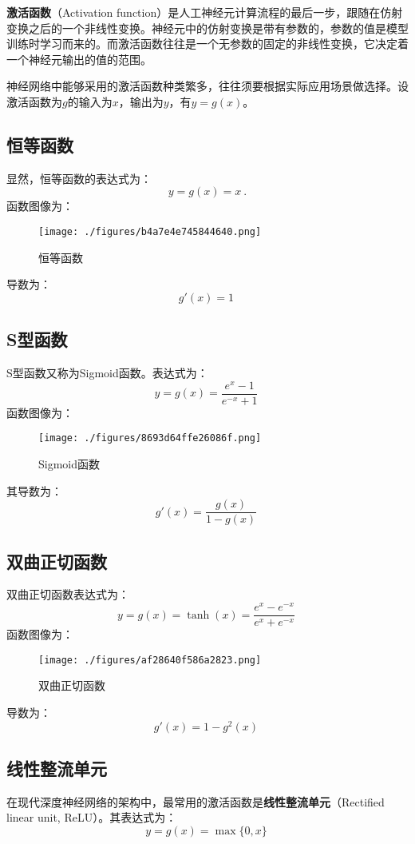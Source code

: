 

\textbf{激活函数}（Activation function）是人工神经元计算流程的最后一步，跟随在仿射变换之后的一个非线性变换。神经元中的仿射变换是带有参数的，参数的值是模型训练时学习而来的。而激活函数往往是一个无参数的固定的非线性变换，它决定着一个神经元输出的值的范围。

神经网络中能够采用的激活函数种类繁多，往往须要根据实际应用场景做选择。设激活函数为$g$的输入为$x$，输出为$y$，有$y=g(x)$。


\subsection{恒等函数}
显然，恒等函数的表达式为：
\begin{equation}
y=g(x)=x~.
\end{equation}
函数图像为：
\begin{figure}[ht]
\centering
\texttt{[image: ./figures/b4a7e4e745844640.png]}
\caption{恒等函数} \label{fig_ActFun}
\end{figure}
导数为：
\begin{equation}
g'(x)=1~
\end{equation}

\subsection{S型函数}
S型函数又称为Sigmoid函数。表达式为：
\begin{equation}
y=g(x)=\frac{e^x-1}{e^{-x}+1}~
\end{equation}
函数图像为：
\begin{figure}[ht]
\centering
\texttt{[image: ./figures/8693d64ffe26086f.png]}
\caption{Sigmoid函数} \label{fig_ActFun2}
\end{figure}
其导数为：
\begin{equation}
g'(x)=\frac{g(x)}{1-g(x)}~
\end{equation}

\subsection{双曲正切函数}
双曲正切函数表达式为：
\begin{equation}
y=g(x)=\tanh(x)=\frac{e^x-e^{-x}}{e^x+e^{-x}}~
\end{equation}
函数图像为：
\begin{figure}[ht]
\centering
\texttt{[image: ./figures/af28640f586a2823.png]}
\caption{双曲正切函数} \label{fig_ActFun3}
\end{figure}
导数为：
\begin{equation}
g'(x)=1-g^2(x)~
\end{equation}

\subsection{线性整流单元}
在现代深度神经网络的架构中，最常用的激活函数是\textbf{线性整流单元}（Rectified linear unit, ReLU）。其表达式为：
\begin{equation}
y=g(x)=\max\{0,x\}~
\end{equation}
